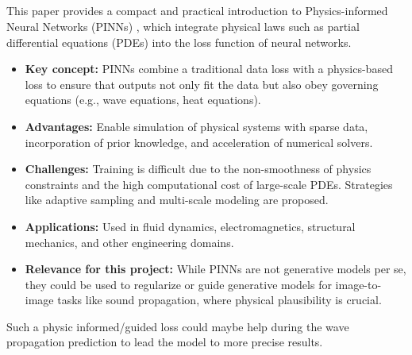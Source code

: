 		\newpage
			
		\subsection{}
			This paper provides a compact and practical introduction to Physics-informed Neural Networks (PINNs) \cite{raissi_physics_2017}, which integrate physical laws such as partial differential equations (PDEs) into the loss function of neural networks.
			
			\begin{itemize}[itemsep=1mm, parsep=0pt]
				\item \textbf{Key concept:} PINNs combine a traditional data loss with a physics-based loss to ensure that outputs not only fit the data but also obey governing equations (e.g., wave equations, heat equations).
				\item \textbf{Advantages:} Enable simulation of physical systems with sparse data, incorporation of prior knowledge, and acceleration of numerical solvers.
				\item \textbf{Challenges:} Training is difficult due to the non-smoothness of physics constraints and the high computational cost of large-scale PDEs. Strategies like adaptive sampling and multi-scale modeling are proposed.
				\item \textbf{Applications:} Used in fluid dynamics, electromagnetics, structural mechanics, and other engineering domains.
				\item \textbf{Relevance for this project:} While PINNs are not generative models per se, they could be used to regularize or guide generative models for image-to-image tasks like sound propagation, where physical plausibility is crucial.
			\end{itemize}
			
			Such a physic informed/guided loss could maybe help during the wave propagation prediction to lead the model to more precise results.
			
	
	
	\newpage

